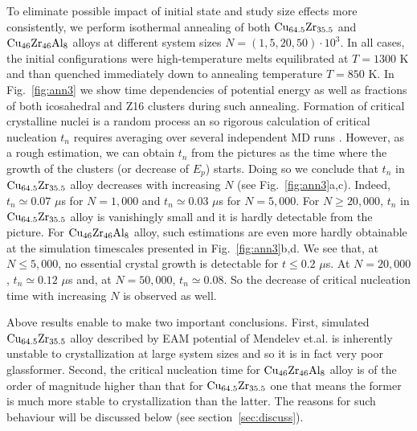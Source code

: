 \documentclass[jcp,twocolumn,superscriptaddress,floatfix,graphicx,showpacs]{revtex4-1}
\begin{document}
 To eliminate possible impact of initial state and study size effects more consistently, we perform isothermal annealing of both ${\rm Cu_{64.5}Zr_{35.5}}$ and ${\rm Cu_{46}Zr_{46}Al_{8}}$ alloys at different system sizes $N=(1, 5, 20, 50 )\cdot 10^3$.  In all cases, the initial configurations were high-temperature melts equilibrated at $T=1300$ K and than quenched immediately down to annealing temperature $T=850$ K. In Fig.~\ref{fig:ann3} we show time dependencies of potential energy as well as fractions of both icosahedral and Z16 clusters during such annealing. Formation of critical crystalline nuclei is a random process an so rigorous calculation of critical nucleation $t_{n}$  requires averaging over several independent MD runs \cite{Ingebrigtsen2018crystallisation}. However, as a rough estimation, we can obtain  $t_{n}$ from the pictures as the time where the growth of the clusters (or decrease of $E_p$) starts. Doing so we conclude that $t_{n}$ in ${\rm Cu_{64.5}Zr_{35.5}}$ alloy decreases with increasing $N$ (see Fig.~\ref{fig:ann3}a,c). Indeed,  $t_n\simeq 0.07$ $\mu$s for $N=1,000$  and $t_n\simeq 0.03$ $\mu$s for $N=5,000$. For $N\geq 20,000$,  $t_{n}$ in ${\rm Cu_{64.5}Zr_{35.5}}$ alloy is vanishingly small and it is hardly detectable from the picture. For ${\rm Cu_{46}Zr_{46}Al_{8}}$ alloy, such estimations are even more hardly obtainable at the simulation timescales presented in Fig.~\ref{fig:ann3}b,d. We see that, at $N \leq 5,000$, no essential crystal growth is detectable for $t\leq 0.2$ $\mu$s. At $N = 20,000$, $t_n\simeq 0.12$ $\mu$s and, at $N = 50,000$, $t_n\simeq 0.08$. So the decrease of critical nucleation time with increasing $N$ is observed as well.

 Above results enable to make two important conclusions. First, simulated ${\rm Cu_{64.5}Zr_{35.5}}$ alloy described by EAM potential of Mendelev et.al. is inherently unstable to crystallization at large system sizes and so it is in fact very poor glassformer. Second, the critical nucleation time for ${\rm Cu_{46}Zr_{46}Al_{8}}$ alloy is of the order of magnitude higher than that for ${\rm Cu_{64.5}Zr_{35.5}}$ one that means the former is much more stable to crystallization than the latter. The reasons for such behaviour will be discussed below (see section~\ref{sec:discuss}).
\end{document}
